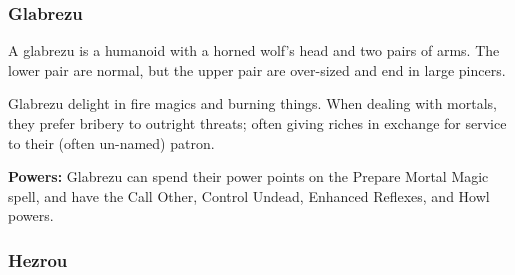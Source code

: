 \begin{multicols*}{2}
\subsubsection{Glabrezu}

A glabrezu is a humanoid with a horned wolf’s head and two pairs of arms. The lower pair are normal, but the upper pair are over-sized and end in large pincers.

Glabrezu delight in fire magics and burning things. When dealing with mortals, they prefer bribery to outright threats; often giving riches in exchange for service to their (often un-named) patron.

\textbf{Powers:} Glabrezu can spend their power points on the Prepare Mortal Magic spell, and have the Call Other, Control Undead, Enhanced Reflexes, and Howl powers.

\subsubsection{Hezrou}
\end{multicols*}
